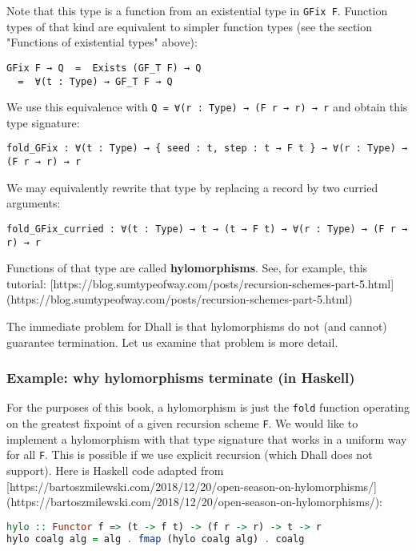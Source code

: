 Note that this type is a function from an existential type in \lstinline!GFix F!.
Function types of that kind are equivalent to simpler function types (see the section "Functions of existential types" above):


\begin{lstlisting}[language=Dhall]
GFix F → Q  =  Exists (GF_T F) → Q
  =  ∀(t : Type) → GF_T F → Q
\end{lstlisting}


We use this equivalence with \lstinline!Q = ∀(r : Type) → (F r → r) → r! and obtain this type signature:


\begin{lstlisting}[language=Dhall]
fold_GFix : ∀(t : Type) → { seed : t, step : t → F t } → ∀(r : Type) → (F r → r) → r
\end{lstlisting}


We may equivalently rewrite that type by replacing a record by two curried arguments:


\begin{lstlisting}[language=Dhall]
fold_GFix_curried : ∀(t : Type) → t → (t → F t) → ∀(r : Type) → (F r → r) → r
\end{lstlisting}


Functions of that type are called \textbf{hylomorphisms}.
See, for example, this tutorial: [https://blog.sumtypeofway.com/posts/recursion-schemes-part-5.html](https://blog.sumtypeofway.com/posts/recursion-schemes-part-5.html)


The immediate problem for Dhall is that hylomorphisms do not (and cannot) guarantee termination.
Let us examine that problem is more detail.


\subsubsection{Example: why hylomorphisms terminate (in Haskell)}


For the purposes of this book, a hylomorphism is just the \lstinline!fold! function operating on the greatest fixpoint of a given recursion scheme \lstinline!F!.
We would like to implement a hylomorphism with that type signature that works in a uniform way for all \lstinline!F!.
This is possible if we use explicit recursion (which Dhall does not support).
Here is Haskell code adapted from [https://bartoszmilewski.com/2018/12/20/open-season-on-hylomorphisms/](https://bartoszmilewski.com/2018/12/20/open-season-on-hylomorphisms/):


\begin{lstlisting}[language=Haskell]
hylo :: Functor f => (t -> f t) -> (f r -> r) -> t -> r
hylo coalg alg = alg . fmap (hylo coalg alg) . coalg
\end{lstlisting}


